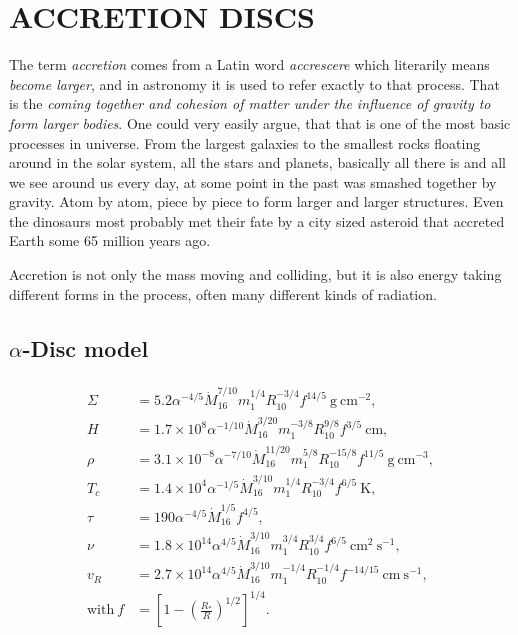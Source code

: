 \chapter{\color{red}ACCRETION DISCS}

The term \emph{accretion} comes from a Latin word \emph{accrescere} which literarily means \emph{become larger}, and in astronomy it is used to refer exactly to that process. That is the \emph{coming together and cohesion of matter under the influence of gravity to form larger bodies}. One could very easily argue, that that is one of the most basic processes in universe. From the largest galaxies to the smallest rocks floating around in the solar system, all the stars and planets, basically all there is and all we see around us every day, at some point in the past was smashed together by gravity. Atom by atom, piece by piece to form larger and larger structures. Even the dinosaurs most probably met their fate by a city sized asteroid that accreted Earth some 65 million years ago. 

Accretion is not only the mass moving and colliding, but it is also energy taking different forms in the process, often many different kinds of radiation.

\section[$\alpha$-Disc model]{$\alpha$-Disc model}

\begin{align}
\begin{split}
\Sigma 	&= 5.2 \alpha^{-4/5} \dot{M}^{7/10}_{16} m^{1/4}_1 R^{-3/4}_{10} f^{14/5}\ \mathrm{g\ cm^{-2}}, \\
H		&= 1.7 \times 10^8 \alpha^{-1/10} \dot{M}^{3/20}_{16} m^{-3/8}_1 R^{9/8}_{10} f^{3/5}\ \mathrm{cm}, \\
\rho		&= 3.1 \times 10^{-8} \alpha^{-7/10} \dot{M}^{11/20}_{16} m^{5/8}_1 R^{-15/8}_{10} f^{11/5}\ \mathrm{g\ cm^{-3}}, \\
T_c		&= 1.4 \times 10^4 \alpha^{-1/5} \dot{M}^{3/10}_{16} m^{1/4}_1 R^{-3/4}_{10} f^{6/5}\ \mathrm{K}, \\
\tau		&= 190 \alpha^{-4/5} \dot{M}^{1/5}_{16} f^{4/5}, \\
\nu		&= 1.8 \times 10^{14} \alpha^{4/5} \dot{M}^{3/10}_{16} m^{3/4}_1 R^{3/4}_{10} f^{6/5}\ \mathrm{cm^2\ s^{-1}},  \\
v_R		&= 2.7 \times 10^{14} \alpha^{4/5} \dot{M}^{3/10}_{16} m^{-1/4}_1 R^{-1/4}_{10} f^{-14/15}\ \mathrm{cm\ s^{-1}},  \\
\mathrm{with}\ f		&= \left[ 1 - \left( \frac{R_*}{R} \right)^{1/2} \right]^{1/4}. \\
\end{split}
\label{eq:alpha_model}
\end{align}

